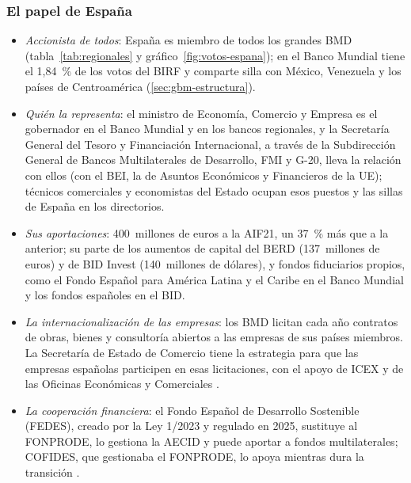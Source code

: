 \documentclass[11pt]{article}
\begin{document}
\subsubsection{El papel de España}\label{sec:papel-espana}

\begin{itemize}
\item \emph{Accionista de todos}: España es miembro de todos los grandes BMD (tabla~\ref{tab:regionales} y gráfico~\ref{fig:votos-espana}); en el Banco Mundial tiene el 1,84~\% de los votos del BIRF y comparte silla con México, Venezuela y los países de Centroamérica (\ref{sec:gbm-estructura}).
\item \emph{Quién la representa}: el ministro de Economía, Comercio y Empresa es el gobernador en el Banco Mundial y en los bancos regionales, y la Secretaría General del Tesoro y Financiación Internacional, a través de la Subdirección General de Bancos Multilaterales de Desarrollo, FMI y G-20, lleva la relación con ellos (con el BEI, la de Asuntos Económicos y Financieros de la UE); técnicos comerciales y economistas del Estado ocupan esos puestos y las sillas de España en los directorios\nocite{RD2024Estructura,BM2026Gobernadores}.
\item \emph{Sus aportaciones}: 400~millones de euros a la AIF21, un 37~\% más que a la anterior\nocite{BM2024AIF21Espana}; su parte de los aumentos de capital del BERD (137~millones de euros) y de BID Invest (140~millones de dólares)\nocite{Hacienda2024BERD,Hacienda2025BIDInvest}, y fondos fiduciarios propios, como el Fondo Español para América Latina y el Caribe en el Banco Mundial y los fondos españoles en el BID.
\item \emph{La internacionalización de las empresas}: los BMD licitan cada año contratos de obras, bienes y consultoría abiertos a las empresas de sus países miembros. La Secretaría de Estado de Comercio tiene la estrategia para que las empresas españolas participen en esas licitaciones, con el apoyo de ICEX y de las Oficinas Económicas y Comerciales  .
\item \emph{La cooperación financiera}: el Fondo Español de Desarrollo Sostenible (FEDES), creado por la Ley 1/2023 y regulado en 2025, sustituye al FONPRODE, lo gestiona la AECID y puede aportar a fondos multilaterales; COFIDES, que gestionaba el FONPRODE, lo apoya mientras dura la transición \nocite{Ley2023Cooperacion,RD2025FEDES}.
\end{itemize}
\end{document}

